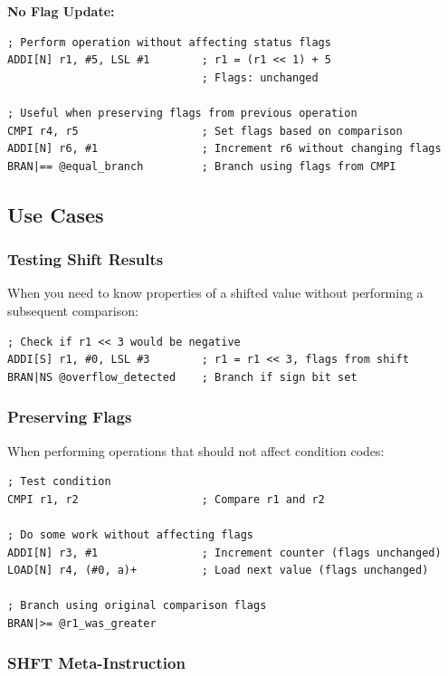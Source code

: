 \textbf{No Flag Update:}
\begin{lstlisting}
; Perform operation without affecting status flags
ADDI[N] r1, #5, LSL #1        ; r1 = (r1 << 1) + 5
                              ; Flags: unchanged

; Useful when preserving flags from previous operation
CMPI r4, r5                   ; Set flags based on comparison
ADDI[N] r6, #1                ; Increment r6 without changing flags
BRAN|== @equal_branch         ; Branch using flags from CMPI
\end{lstlisting}

\subsection{Use Cases}

\subsubsection{Testing Shift Results}

When you need to know properties of a shifted value without performing a subsequent comparison:

\begin{lstlisting}
; Check if r1 << 3 would be negative
ADDI[S] r1, #0, LSL #3        ; r1 = r1 << 3, flags from shift
BRAN|NS @overflow_detected    ; Branch if sign bit set
\end{lstlisting}

\subsubsection{Preserving Flags}

When performing operations that should not affect condition codes:

\begin{lstlisting}
; Test condition
CMPI r1, r2                   ; Compare r1 and r2

; Do some work without affecting flags
ADDI[N] r3, #1                ; Increment counter (flags unchanged)
LOAD[N] r4, (#0, a)+          ; Load next value (flags unchanged)

; Branch using original comparison flags
BRAN|>= @r1_was_greater
\end{lstlisting}

\subsubsection{SHFT Meta-Instruction}

